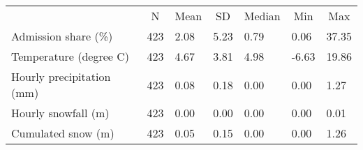 
\begin{tabular}[t]{lllllll}
\toprule
\multicolumn{1}{c}{ } & \multicolumn{1}{c}{N} & \multicolumn{1}{c}{Mean} & \multicolumn{1}{c}{SD} & \multicolumn{1}{c}{Median} & \multicolumn{1}{c}{Min} & \multicolumn{1}{c}{Max} \\
\cmidrule(l{3pt}r{3pt}){2-2} \cmidrule(l{3pt}r{3pt}){3-3} \cmidrule(l{3pt}r{3pt}){4-4} \cmidrule(l{3pt}r{3pt}){5-5} \cmidrule(l{3pt}r{3pt}){6-6} \cmidrule(l{3pt}r{3pt}){7-7}
Admission share (\%) & 423 & 2.08 & 5.23 & 0.79 & 0.06 & 37.35\\
Temperature (degree C) & 423 & 4.67 & 3.81 & 4.98 & -6.63 & 19.86\\
Hourly precipitation (mm) & 423 & 0.08 & 0.18 & 0.00 & 0.00 & 1.27\\
Hourly snowfall (m) & 423 & 0.00 & 0.00 & 0.00 & 0.00 & 0.01\\
Cumulated snow (m) & 423 & 0.05 & 0.15 & 0.00 & 0.00 & 1.26\\
\bottomrule
\end{tabular}
